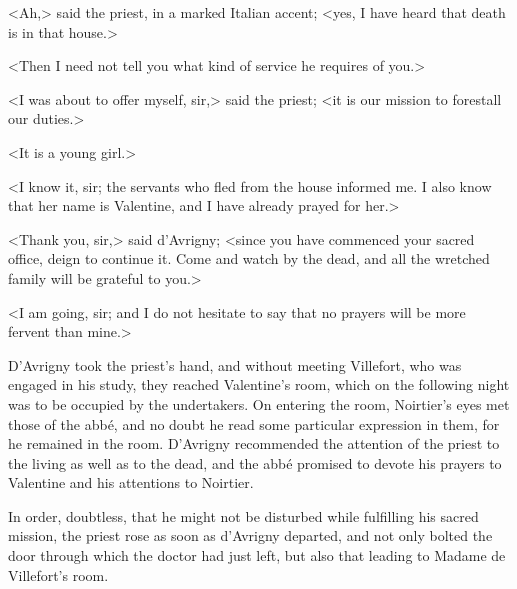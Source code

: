  <Ah,> said the priest, in a marked Italian accent; <yes, I have heard that death is in that house.> 

 <Then I need not tell you what kind of service he requires of you.> 

 <I was about to offer myself, sir,> said the priest; <it is our mission to forestall our duties.> 

 <It is a young girl.> 

 <I know it, sir; the servants who fled from the house informed me. I also know that her name is Valentine, and I have already prayed for her.> 

 <Thank you, sir,> said d'Avrigny; <since you have commenced your sacred office, deign to continue it. Come and watch by the dead, and all the wretched family will be grateful to you.> 

 <I am going, sir; and I do not hesitate to say that no prayers will be more fervent than mine.> 

 D'Avrigny took the priest's hand, and without meeting Villefort, who was engaged in his study, they reached Valentine's room, which on the following night was to be occupied by the undertakers. On entering the room, Noirtier's eyes met those of the abbé, and no doubt he read some particular expression in them, for he remained in the room. D'Avrigny recommended the attention of the priest to the living as well as to the dead, and the abbé promised to devote his prayers to Valentine and his attentions to Noirtier. 

 In order, doubtless, that he might not be disturbed while fulfilling his sacred mission, the priest rose as soon as d'Avrigny departed, and not only bolted the door through which the doctor had just left, but also that leading to Madame de Villefort's room. 